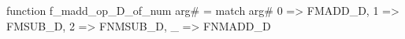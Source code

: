 function f_madd_op_D_of_num arg# = match arg# {
  0 => FMADD_D,
  1 => FMSUB_D,
  2 => FNMSUB_D,
  _ => FNMADD_D
}
